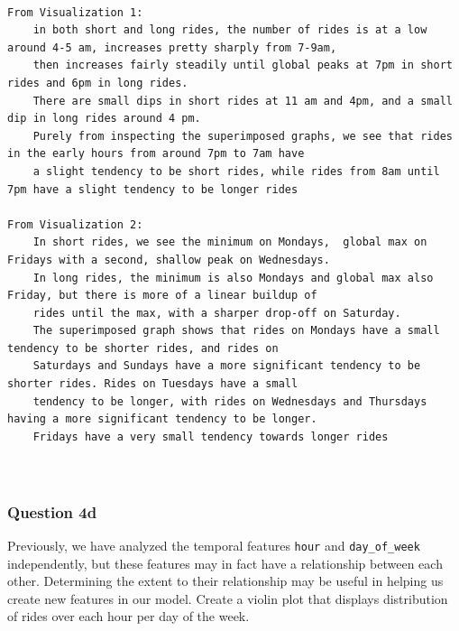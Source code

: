 \documentclass[11pt]{article}
\begin{document}
    \begin{Verbatim}[commandchars=\\\{\}]

From Visualization 1:
    in both short and long rides, the number of rides is at a low around 4-5 am, increases pretty sharply from 7-9am,
    then increases fairly steadily until global peaks at 7pm in short rides and 6pm in long rides.
    There are small dips in short rides at 11 am and 4pm, and a small dip in long rides around 4 pm.
    Purely from inspecting the superimposed graphs, we see that rides in the early hours from around 7pm to 7am have 
    a slight tendency to be short rides, while rides from 8am until 7pm have a slight tendency to be longer rides

From Visualization 2:
    In short rides, we see the minimum on Mondays,  global max on Fridays with a second, shallow peak on Wednesdays. 
    In long rides, the minimum is also Mondays and global max also Friday, but there is more of a linear buildup of 
    rides until the max, with a sharper drop-off on Saturday.
    The superimposed graph shows that rides on Mondays have a small tendency to be shorter rides, and rides on 
    Saturdays and Sundays have a more significant tendency to be shorter rides. Rides on Tuesdays have a small 
    tendency to be longer, with rides on Wednesdays and Thursdays having a more significant tendency to be longer. 
    Fridays have a very small tendency towards longer rides



    \end{Verbatim}

    \subsubsection{Question 4d}\label{question-4d}

    Previously, we have analyzed the temporal features \texttt{hour} and
\texttt{day\_of\_week} independently, but these features may in fact
have a relationship between each other. Determining the extent to their
relationship may be useful in helping us create new features in our
model. Create a violin plot that displays distribution of rides over
each hour per day of the week.
\end{document}
